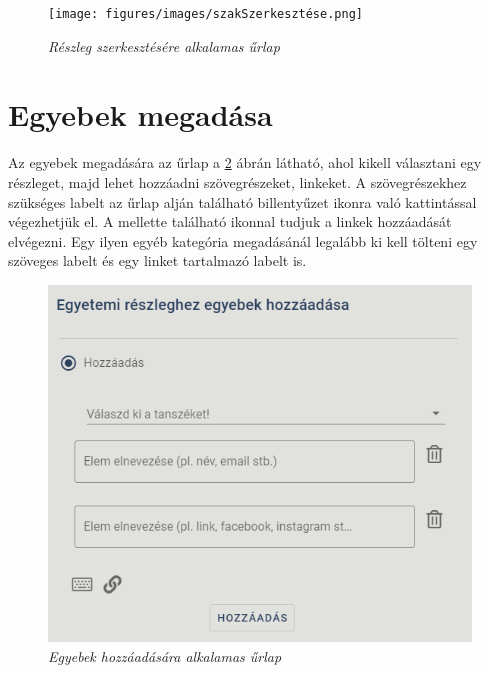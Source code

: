 \begin{figure}[H]
	\centering
	\texttt{[image: figures/images/szakSzerkesztése.png]}
	\caption[Szak szerkesztésére alkalamas űrlap]{\textit{Részleg szerkesztésére alkalamas űrlap}}
	\label{fig:updateBranch}
\end{figure}

\section{Egyebek megadása}
Az egyebek megadására az űrlap a \ref{fig:addOtherBranch} ábrán látható, ahol kikell választani egy részleget, majd lehet hozzáadni szövegrészeket, linkeket. A szövegrészekhez szükséges labelt az űrlap alján található billentyűzet ikonra való kattintással végezhetjük el. A mellette található ikonnal tudjuk a linkek hozzáadását elvégezni. Egy ilyen egyéb kategória megadásánál legalább ki kell tölteni egy szöveges labelt és egy linket tartalmazó labelt is.
\begin{figure}[H]
	\centering
	\includegraphics[width=0.7\linewidth]{figures/images/egyebekHozzadasa.png}
	\caption[Egyebek hozzáadására alkalamas űrlap]{\textit{Egyebek hozzáadására alkalamas űrlap}}
	\label{fig:addOtherBranch}
\end{figure}
